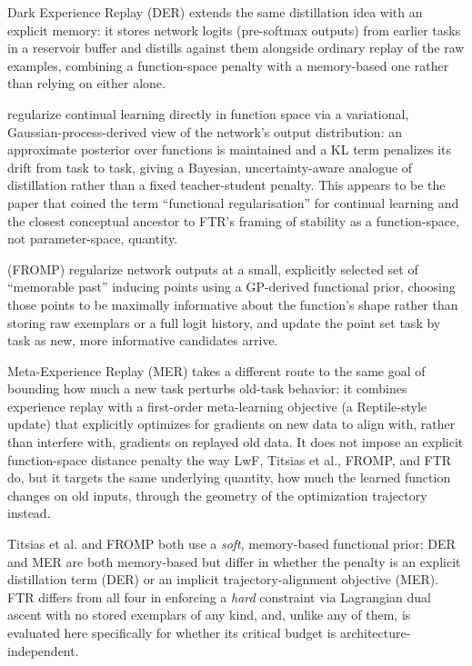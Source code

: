 \documentclass[11pt]{article}
\begin{document}
Dark Experience Replay (DER) \citep{buzzega2020dark} extends the same
distillation idea with an explicit memory: it stores network logits
(pre-softmax outputs) from earlier tasks in a reservoir buffer and
distills against them alongside ordinary replay of the raw examples,
combining a function-space penalty with a memory-based one rather than
relying on either alone.

\citet{titsias2020functional} regularize continual learning directly in
function space via a variational, Gaussian-process-derived view of the
network's output distribution: an approximate posterior over functions is
maintained and a KL term penalizes its drift from task to task, giving a
Bayesian, uncertainty-aware analogue of distillation rather than a fixed
teacher-student penalty. This appears to be the paper that coined
the term ``functional regularisation'' for continual learning and the
closest conceptual ancestor to FTR's framing of stability as a
function-space, not parameter-space, quantity.

\citet{pan2020continual} (FROMP) regularize network outputs at a small,
explicitly selected set of ``memorable past'' inducing points using a
GP-derived functional prior, choosing those points to be maximally
informative about the function's shape rather than storing raw exemplars
or a full logit history, and update the point set task by task as new,
more informative candidates arrive.

Meta-Experience Replay (MER) \citep{riemer2019learning} takes a different
route to the same goal of bounding how much a new task perturbs old-task
behavior: it combines experience replay with a first-order meta-learning
objective (a Reptile-style update) that explicitly optimizes for gradients
on new data to align with, rather than interfere with, gradients on
replayed old data. It does not impose an explicit function-space distance
penalty the way LwF, Titsias et al., FROMP, and FTR do, but it targets the
same underlying quantity, how much the learned function changes on old
inputs, through the geometry of the optimization trajectory instead.

Titsias et al. and FROMP both use a \emph{soft}, memory-based functional
prior; DER and MER are both memory-based but differ in whether the penalty
is an explicit distillation term (DER) or an implicit trajectory-alignment
objective (MER). FTR differs from all four in enforcing a \emph{hard}
constraint via Lagrangian dual ascent with no stored exemplars of any
kind, and, unlike any of them, is evaluated here specifically for whether
its critical budget is architecture-independent.
\end{document}
